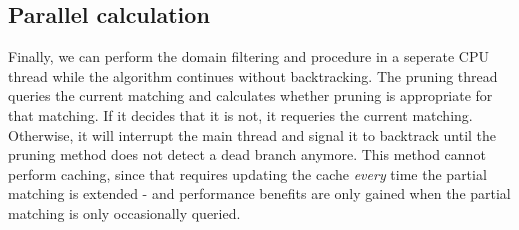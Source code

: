 \subsection{Parallel calculation}
Finally, we can perform the domain filtering and procedure in a seperate CPU thread while the algorithm continues without backtracking. The pruning thread queries the current matching and calculates whether pruning is appropriate for that matching. If it decides that it is not, it requeries the current matching. Otherwise, it will interrupt the main thread and signal it to backtrack until the pruning method does not detect a dead branch anymore. This method cannot perform caching, since that requires updating the cache \textit{every} time the partial matching is extended - and performance benefits are only gained when the partial matching is only occasionally queried.
